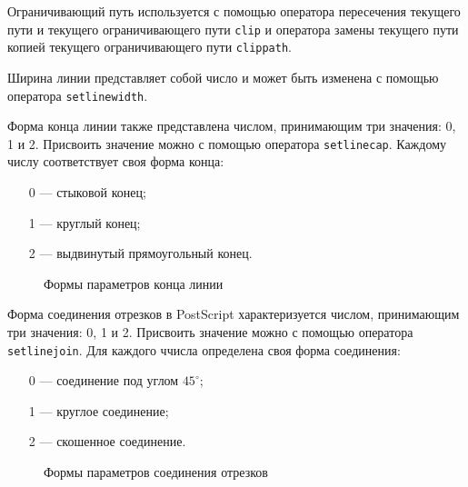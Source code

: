 \documentclass[14pt]{extarticle}
\begin{document}
Ограничивающий путь используется с помощью оператора пересечения текущего пути и текущего ограничивающего пути \texttt{clip} и оператора замены текущего пути копией текущего ограничивающего пути \texttt{clippath}.

Ширина линии представляет собой число и может быть изменена с помощью оператора \texttt{setlinewidth}.

Форма конца линии также представлена числом, принимающим три значения: 0, 1 и 2. Присвоить значение можно с помощью оператора \texttt{setlinecap}. Каждому числу соответствует своя форма конца:
\begin{itemize}
\item [0 ---] стыковой конец;
\item [1 ---] круглый конец;
\item [2 ---] выдвинутый прямоугольный конец.
\end{itemize} 

\begin{figure} [h]
\caption{Формы параметров конца линии}\label{pic_linecap}
\end{figure}

Форма соединения отрезков в PostScript характеризуется числом, принимающим три значения: 0, 1 и 2. Присвоить значение можно с помощью оператора \texttt{setlinejoin}. Для каждого ччисла определена своя форма соединения:
\begin{itemize}
\item [0 ---] соединение под углом $45^{\circ} $;
\item [1 ---] круглое соединение;
\item [2 ---] скошенное соединение.
\end{itemize} 

\begin{figure} [h]
\caption{Формы параметров соединения отрезков}\label{pic_linejoin}
\end{figure}
\end{document}
